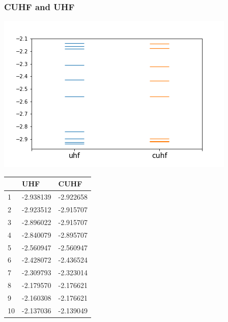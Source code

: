\documentclass[aspectratio=169]{beamer}
\begin{document}
\begin{frame}
    \frametitle{CUHF and UHF}
    \begin{minipage}[b]{0.6\linewidth}
        \includegraphics[width=\linewidth]{./figures/h3_cis.png}
    \end{minipage}
    \begin{minipage}[b]{0.3\linewidth}
        \begin{table}[h]
            \label{tab:excits}
            \begin{tabular}{l|l|l}
                 & UHF       & CUHF      \\
              \hline
              1  & -2.938139 & -2.922658 \\
              2  & -2.923512 & -2.915707 \\
              3  & -2.896022 & -2.915707 \\
              4  & -2.840079 & -2.895707 \\
              5  & -2.560947 & -2.560947 \\
              6  & -2.428072 & -2.436524 \\
              7  & -2.309793 & -2.323014 \\
              8  & -2.179570 & -2.176621 \\
              9  & -2.160308 & -2.176621 \\
              10 & -2.137036 & -2.139049
            \end{tabular}
          \end{table}
    \end{minipage}
\end{frame}
\end{document}
